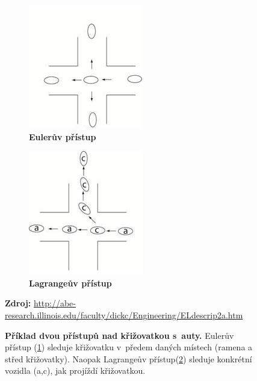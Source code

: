\begin{figure}[h]
	\centering
	\begin{subfigure}{.5\textwidth}
		\centering
		\includegraphics[width=0.7\linewidth]{obrazky-figures/EulerLagran_02.jpg}
		\caption{\textbf{Eulerův přístup}}
		\label{fig:Euler}
	\end{subfigure}%
	\begin{subfigure}{.5\textwidth}
		\centering
		\includegraphics[width=0.7\linewidth]{obrazky-figures/EulerLagran_01.jpg}
		\caption{\textbf{Lagrangeův přístup}}
		\label{fig:Lagran}
	\end{subfigure}
	\caption{\textbf{Příklad dvou přístupů nad křižovatkou s~auty.} Eulerův přístup (\ref{fig:Euler}) sleduje křižovatku v~předem daných místech (ramena a střed křižovatky). Naopak Lagrangeův přístup(\ref{fig:Lagran}) sleduje konkrétní vozidla (a,c), jak projíždí křižovatkou.}
	\textbf{Zdroj:} \url{http://abe-research.illinois.edu/faculty/dickc/Engineering/ELdescrip2a.htm}
	\label{fig:Cross}
\end{figure}

